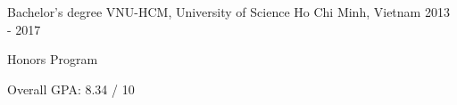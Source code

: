 

\begin{cventries}

  \cventry
    {Bachelor’s degree} %
    {VNU-HCM, University of Science} %
    {Ho Chi Minh, Vietnam} %
    {2013 - 2017} %
    {
      \begin{cvitems} %
        \item {Honors Program}
        \item {Overall GPA: 8.34 / 10}
      \end{cvitems}
    }

\end{cventries}
